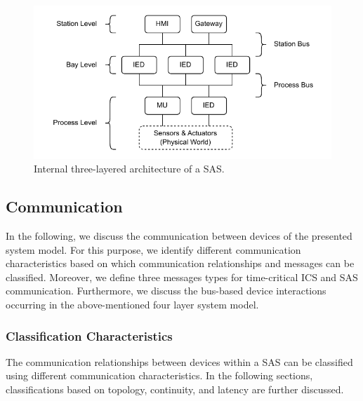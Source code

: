 \begin{figure}
    \centering
    \includegraphics[width=1.0\linewidth]{figures/substation_architecture.drawio.pdf}
    \caption{Internal three-layered architecture of a SAS.}
    \label{fig:substation_architecture}
\end{figure}

\subsection{Communication}
\label{sec:approach:system_model:communication}
In the following, we discuss the communication between devices of the presented system model.
For this purpose, we identify different communication characteristics based on which communication relationships and messages can be classified.
Moreover, we define three messages types for time-critical ICS and SAS communication.
Furthermore, we discuss the bus-based device interactions occurring in the above-mentioned four layer system model.

\subsubsection{Classification Characteristics}
The communication relationships between devices within a SAS can be classified using different communication characteristics.
In the following sections, classifications based on topology, continuity, and latency are further discussed.


